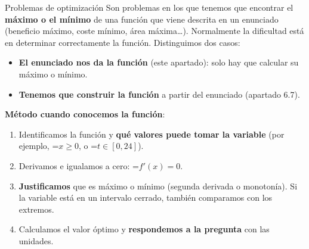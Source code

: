 \documentclass[11pt,a4paper]{article}
\newcommand{\fmm}[1]{\setbox0=\hbox{$#1$}\ifdim\wd0>\linewidth\[#1\]\else\mbox{\box0}\fi}
\newcommand{\fmuline}[1]{\textbf{\color{fmaccent}#1}}
\begin{document}
  

  
\begin{fmdef}{Problemas de optimización}
Son problemas en los que tenemos que encontrar el \textbf{máximo o el mínimo} de una función que viene descrita en un enunciado (beneficio máximo, coste mínimo, área máxima\dots{}). Normalmente la dificultad está en determinar correctamente la función. Distinguimos dos casos:

      
\begin{itemize}
\item \textbf{El enunciado nos da la función} (este apartado): solo hay que calcular su máximo o mínimo.
\item \textbf{Tenemos que construir la función} a partir del enunciado (apartado 6.7).
\end{itemize}

      

\fmuline{Método cuando conocemos la función}:

      
\begin{enumerate}
\item Identificamos la función y \textbf{qué valores puede tomar la variable} (por ejemplo, \fmm{x\geq0}, o \fmm{t\in[0,24]}).
\item Derivamos e igualamos a cero: \fmm{f'(x)=0}.
\item \textbf{Justificamos} que es máximo o mínimo (segunda derivada o monotonía). Si la variable está en un intervalo cerrado, también comparamos con los extremos.
\item Calculamos el valor óptimo y \textbf{respondemos a la pregunta} con las unidades.
\end{enumerate}
\end{fmdef}
\end{document}
